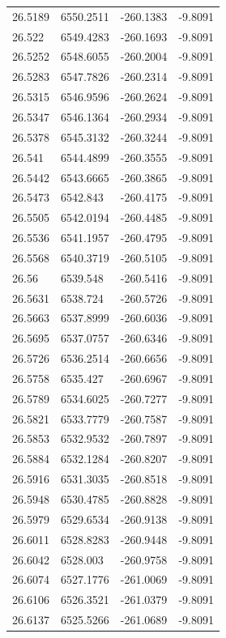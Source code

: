 \begin{table}[H]
\begin{tabular}{llll}
26.5189 & 6550.2511 & -260.1383 & -9.8091 \\
26.522 & 6549.4283 & -260.1693 & -9.8091 \\
26.5252 & 6548.6055 & -260.2004 & -9.8091 \\
26.5283 & 6547.7826 & -260.2314 & -9.8091 \\
26.5315 & 6546.9596 & -260.2624 & -9.8091 \\
26.5347 & 6546.1364 & -260.2934 & -9.8091 \\
26.5378 & 6545.3132 & -260.3244 & -9.8091 \\
26.541 & 6544.4899 & -260.3555 & -9.8091 \\
26.5442 & 6543.6665 & -260.3865 & -9.8091 \\
26.5473 & 6542.843 & -260.4175 & -9.8091 \\
26.5505 & 6542.0194 & -260.4485 & -9.8091 \\
26.5536 & 6541.1957 & -260.4795 & -9.8091 \\
26.5568 & 6540.3719 & -260.5105 & -9.8091 \\
26.56 & 6539.548 & -260.5416 & -9.8091 \\
26.5631 & 6538.724 & -260.5726 & -9.8091 \\
26.5663 & 6537.8999 & -260.6036 & -9.8091 \\
26.5695 & 6537.0757 & -260.6346 & -9.8091 \\
26.5726 & 6536.2514 & -260.6656 & -9.8091 \\
26.5758 & 6535.427 & -260.6967 & -9.8091 \\
26.5789 & 6534.6025 & -260.7277 & -9.8091 \\
26.5821 & 6533.7779 & -260.7587 & -9.8091 \\
26.5853 & 6532.9532 & -260.7897 & -9.8091 \\
26.5884 & 6532.1284 & -260.8207 & -9.8091 \\
26.5916 & 6531.3035 & -260.8518 & -9.8091 \\
26.5948 & 6530.4785 & -260.8828 & -9.8091 \\
26.5979 & 6529.6534 & -260.9138 & -9.8091 \\
26.6011 & 6528.8283 & -260.9448 & -9.8091 \\
26.6042 & 6528.003 & -260.9758 & -9.8091 \\
26.6074 & 6527.1776 & -261.0069 & -9.8091 \\
26.6106 & 6526.3521 & -261.0379 & -9.8091 \\
26.6137 & 6525.5266 & -261.0689 & -9.8091 \\

\end{tabular}
\end{table}

